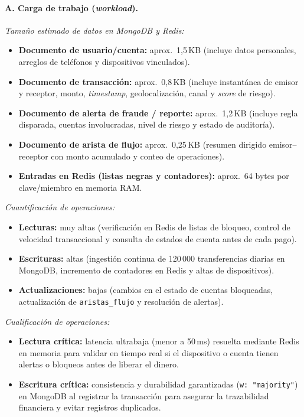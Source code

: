 \documentclass[11pt,a4paper]{article}
\begin{document}
	\paragraph{A. Carga de trabajo (\textit{workload}).}
	\textit{Tamaño estimado de datos en MongoDB y Redis:}
	\begin{itemize}[leftmargin=2em]
		\item \textbf{Documento de usuario/cuenta:} aprox.\ 1,5\,KB (incluye datos personales, arreglos de teléfonos y dispositivos vinculados).
		\item \textbf{Documento de transacción:} aprox.\ 0,8\,KB (incluye instantánea de emisor y receptor, monto, \textit{timestamp}, geolocalización, canal y \textit{score} de riesgo).
		\item \textbf{Documento de alerta de fraude / reporte:} aprox.\ 1,2\,KB (incluye regla disparada, cuentas involucradas, nivel de riesgo y estado de auditoría).
		\item \textbf{Documento de arista de flujo:} aprox.\ 0,25\,KB (resumen dirigido emisor--receptor con monto acumulado y conteo de operaciones).
		\item \textbf{Entradas en Redis (listas negras y contadores):} aprox.\ 64 bytes por clave/miembro en memoria RAM.
	\end{itemize}
	\textit{Cuantificación de operaciones:}
	\begin{itemize}[leftmargin=2em]
		\item \textbf{Lecturas:} muy altas (verificación en Redis de listas de bloqueo, control de velocidad transaccional y consulta de estados de cuenta antes de cada pago).
		\item \textbf{Escrituras:} altas (ingestión continua de 120\,000 transferencias diarias en MongoDB, incremento de contadores en Redis y altas de dispositivos).
		\item \textbf{Actualizaciones:} bajas (cambios en el estado de cuentas bloqueadas, actualización de \texttt{aristas\_flujo} y resolución de alertas).
	\end{itemize}
	\textit{Cualificación de operaciones:}
	\begin{itemize}[leftmargin=2em]
		\item \textbf{Lectura crítica:} latencia ultrabaja (menor a 50\,ms) resuelta mediante Redis en memoria para validar en tiempo real si el dispositivo o cuenta tienen alertas o bloqueos antes de liberar el dinero.
		\item \textbf{Escritura crítica:} consistencia y durabilidad garantizadas (\texttt{w: "majority"}) en MongoDB al registrar la transacción para asegurar la trazabilidad financiera y evitar registros duplicados.
	\end{itemize}
	
\end{document}
